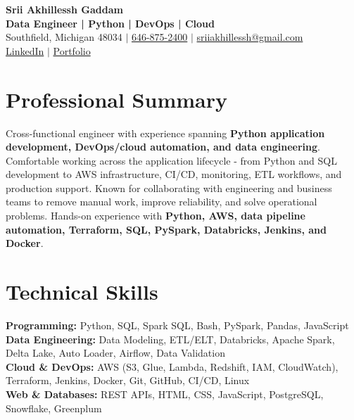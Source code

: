 \documentclass[letterpaper,10pt]{article}
\begin{document}
\fontsize{9.35pt}{10.45pt}\selectfont

\begin{center}
    {\LARGE \textbf{Srii Akhillessh Gaddam}} \\[-1pt]
    \textbf{Data Engineer | Python | DevOps | Cloud} \\[2pt]
    Southfield, Michigan 48034 $|$
    \href{tel:6468752400}{646-875-2400} $|$
    \href{mailto:sriiakhillessh@gmail.com}{sriiakhillessh@gmail.com} \\[1pt]
    \href{https://www.linkedin.com/in/srii-akhiilessh-gaddam-b48668191/}{LinkedIn} $|$
    \href{https://sriiakhillesshg.github.io/portfolio/}{Portfolio}
\end{center}
\vspace{-8pt}

\section{Professional Summary}
\small{Cross-functional engineer with experience spanning \textbf{Python application development, DevOps/cloud automation, and data engineering}. Comfortable working across the application lifecycle - from Python and SQL development to AWS infrastructure, CI/CD, monitoring, ETL workflows, and production support. Known for collaborating with engineering and business teams to remove manual work, improve reliability, and solve operational problems. Hands-on experience with \textbf{Python, AWS, data pipeline automation, Terraform, SQL, PySpark, Databricks, Jenkins, and Docker}.}

\section{Technical Skills}
\small{
\textbf{Programming:} Python, SQL, Spark SQL, Bash, PySpark, Pandas, JavaScript \\
\textbf{Data Engineering:} Data Modeling, ETL/ELT, Databricks, Apache Spark, Delta Lake, Auto Loader, Airflow, Data Validation \\
\textbf{Cloud \& DevOps:} AWS (S3, Glue, Lambda, Redshift, IAM, CloudWatch), Terraform, Jenkins, Docker, Git, GitHub, CI/CD, Linux \\
\textbf{Web \& Databases:} REST APIs, HTML, CSS, JavaScript, PostgreSQL, Snowflake, Greenplum
}

\end{document}
